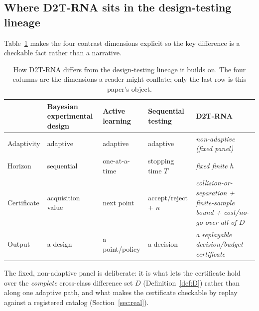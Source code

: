 \documentclass[11pt]{article}
\begin{document}
\subsection{Where \textsc{D2T}-RNA sits in the design-testing lineage}\label{sec:lineage}
Table~\ref{tab:lineage} makes the four contrast dimensions explicit so the key
difference is a checkable fact rather than a narrative.
\begin{table}[t]
\centering
\small
\caption{How \textsc{D2T}-RNA differs from the design-testing lineage it builds on.
The four columns are the dimensions a reader might conflate; only the last row is
this paper's object.}
\label{tab:lineage}
\begin{tabularx}{\textwidth}{@{}lXXXX@{}}
\toprule
& Bayesian experimental design & Active learning & Sequential testing & \textsc{D2T}-RNA\\
\midrule
Adaptivity & adaptive & adaptive & adaptive & \emph{non-adaptive (fixed panel)}\\
Horizon & sequential & one-at-a-time & stopping time $T$ & \emph{fixed finite $h$}\\
Certificate & acquisition value & next point & accept/reject + $n$ & \emph{collision-or-separation + finite-sample bound + cost/no-go over all of $D$}\\
Output & a design & a point/policy & a decision & \emph{a replayable decision/budget certificate}\\
\bottomrule
\end{tabularx}
\end{table}
The fixed, non-adaptive panel is deliberate: it is what lets the certificate hold over
the \emph{complete} cross-class difference set $D$ (Definition~\ref{def:D}) rather than
along one adaptive path, and what makes the certificate checkable by replay against a
registered catalog (Section~\ref{sec:real}).
\end{document}
